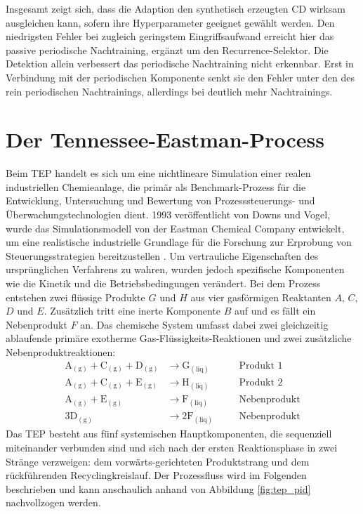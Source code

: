 %
Insgesamt zeigt sich, dass die Adaption den synthetisch erzeugten \ac{CD} wirksam ausgleichen kann, sofern ihre Hyperparameter geeignet gewählt werden. Den niedrigsten Fehler bei zugleich geringstem Eingriffsaufwand erreicht hier das passive periodische Nachtraining, ergänzt um den Recurrence-Selektor. Die Detektion allein verbessert das periodische Nachtraining nicht erkennbar. Erst in Verbindung mit der periodischen Komponente senkt sie den Fehler unter den des rein periodischen Nachtrainings, allerdings bei deutlich mehr Nachtrainings. \par
%
\section{Der Tennessee-Eastman-Process} \label{sec:TEP}
%
Beim \ac{TEP} handelt es sich um eine nichtlineare Simulation einer realen industriellen Chemieanlage, die primär als Benchmark-Prozess für die Entwicklung, Untersuchung und Bewertung von Prozesssteuerungs- und Überwachungstechnologien dient. 1993 veröffentlicht von Downs und Vogel, wurde das Simulationsmodell von der Eastman Chemical Company entwickelt, um eine realistische industrielle Grundlage für die Forschung zur Erprobung von Steuerungsstrategien bereitzustellen \cite{downs.1993}. Um vertrauliche Eigenschaften des ursprünglichen Verfahrens zu wahren, wurden jedoch spezifische Komponenten wie die Kinetik und die Betriebsbedingungen verändert. \newline
Bei dem Prozess entstehen zwei flüssige Produkte $G$ und $H$ aus vier gasförmigen Reaktanten $A$, $C$, $D$ und $E$. Zusätzlich tritt eine inerte Komponente $B$ auf und es fällt ein Nebenprodukt $F$ an. Das chemische System umfasst dabei zwei gleichzeitig ablaufende primäre exotherme Gas-Flüssigkeits-Reaktionen und zwei zusätzliche Nebenproduktreaktionen:
%
\begin{align}
    \mathrm{A_{(g)} + C_{(g)} + D_{(g)}} &\rightarrow \mathrm{G_{(liq)}} \quad &&\text{Produkt 1} \label{eq:chem_1}\\
    \mathrm{A_{(g)} + C_{(g)} + E_{(g)}} &\rightarrow \mathrm{H_{(liq)}} \quad &&\text{Produkt 2} \label{eq:chem_2}\\
    \mathrm{A_{(g)} + E_{(g)}} &\rightarrow \mathrm{F_{(liq)}} \quad &&\text{Nebenprodukt} \label{eq:chem_3}\\
    \mathrm{3D_{(g)}} &\rightarrow \mathrm{2F_{(liq)}} \quad &&\text{Nebenprodukt} \label{eq:chem_4}
\end{align}
%
Das \ac{TEP} besteht aus fünf systemischen Hauptkomponenten, die sequenziell miteinander verbunden sind und sich nach der ersten Reaktionsphase in zwei Stränge verzweigen: dem vorwärts-gerichteten Produktstrang und dem rückführenden Recyclingkreislauf. Der Prozessfluss wird im Folgenden beschrieben und kann anschaulich anhand von Abbildung \ref{fig:tep_pid} nachvollzogen werden.
